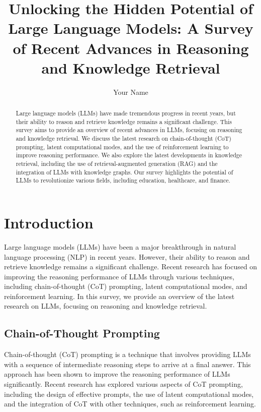 \documentclass{article}
\begin{document}
\title{Unlocking the Hidden Potential of Large Language Models: A Survey of Recent Advances in Reasoning and Knowledge Retrieval}

\author{Your Name}

\maketitle

\begin{abstract}
Large language models (LLMs) have made tremendous progress in recent years, but their ability to reason and retrieve knowledge remains a significant challenge. This survey aims to provide an overview of recent advances in LLMs, focusing on reasoning and knowledge retrieval. We discuss the latest research on chain-of-thought (CoT) prompting, latent computational modes, and the use of reinforcement learning to improve reasoning performance. We also explore the latest developments in knowledge retrieval, including the use of retrieval-augmented generation (RAG) and the integration of LLMs with knowledge graphs. Our survey highlights the potential of LLMs to revolutionize various fields, including education, healthcare, and finance.

\end{abstract}

\section{Introduction}

Large language models (LLMs) have been a major breakthrough in natural language processing (NLP) in recent years. However, their ability to reason and retrieve knowledge remains a significant challenge. Recent research has focused on improving the reasoning performance of LLMs through various techniques, including chain-of-thought (CoT) prompting, latent computational modes, and reinforcement learning. In this survey, we provide an overview of the latest research on LLMs, focusing on reasoning and knowledge retrieval.

\subsection{Chain-of-Thought Prompting}

Chain-of-thought (CoT) prompting is a technique that involves providing LLMs with a sequence of intermediate reasoning steps to arrive at a final answer. This approach has been shown to improve the reasoning performance of LLMs significantly. Recent research has explored various aspects of CoT prompting, including the design of effective prompts, the use of latent computational modes, and the integration of CoT with other techniques, such as reinforcement learning.
\end{document}
